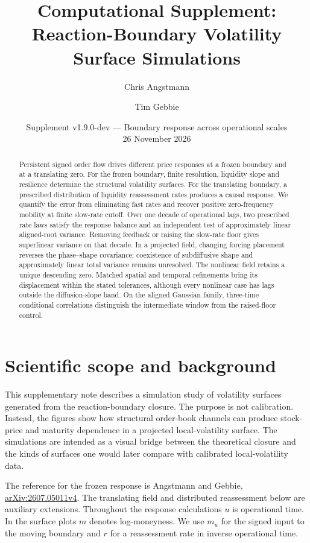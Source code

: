 \documentclass[11pt]{article}
\title{Computational Supplement:\\Reaction-Boundary Volatility Surface Simulations}
\author{Chris Angstmann \and Tim Gebbie}
\date{Supplement v1.9.0-dev --- Boundary response across operational scales\\26 November 2026}
\begin{document}
\maketitle

\begin{abstract}
Persistent signed order flow drives different price responses at a frozen boundary and at a translating zero. For the frozen boundary, finite resolution, liquidity slope and resilience determine the structural volatility surfaces. For the translating boundary, a prescribed distribution of liquidity reassessment rates produces a causal response. We quantify the error from eliminating fast rates and recover positive zero-frequency mobility at finite slow-rate cutoff. Over one decade of operational lags, two prescribed rate laws satisfy the response balance and an independent test of approximately linear aligned-root variance. Removing feedback or raising the slow-rate floor gives superlinear variance on that decade. In a projected field, changing forcing placement reverses the phase--shape covariance; coexistence of subdiffusive shape and approximately linear total variance remains unresolved. The nonlinear field retains a unique descending zero. Matched spatial and temporal refinements bring its displacement within the stated tolerances, although every nonlinear case has lags outside the diffusion-slope band. On the aligned Gaussian family, three-time conditional correlations distinguish the intermediate window from the raised-floor control.
\end{abstract}
\tableofcontents

\section{Scientific scope and background}

This supplementary note describes a simulation study of volatility surfaces
generated from the reaction-boundary closure. The purpose is not calibration.
Instead, the figures show how structural order-book channels can produce
stock-price and maturity dependence in a projected local-volatility surface.
The simulations are intended as a visual bridge between the theoretical
closure and the kinds of surfaces one would later compare with calibrated
local-volatility data.

The reference for the frozen response is Angstmann and Gebbie,
\href{https://arxiv.org/abs/2607.05011v4}{arXiv:2607.05011v4}.
The translating field and distributed reassessment below are auxiliary
extensions. Throughout the response calculations \(u\) is operational
time. In the surface plots \(m\) denotes log-moneyness. We use \(m_u\)
for the signed input to the moving boundary and \(r\) for a reassessment
rate in inverse operational time.
\end{document}

